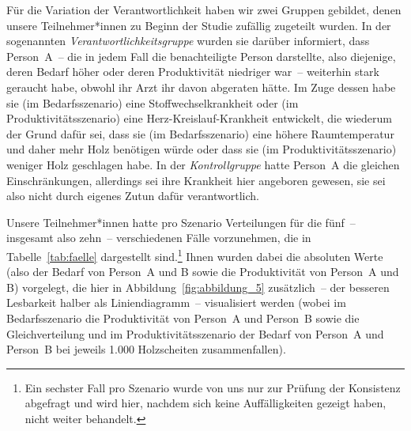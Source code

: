\documentclass[justified,nobib,nohyper,symmetric,twoside]{tufte-book}
\begin{document}
Für die Variation der Verantwortlichkeit haben wir zwei Gruppen gebildet, denen unsere Teilnehmer*innen zu Beginn der Studie zufällig zugeteilt wurden.
In der sogenannten \textit{Verantwortlichkeitsgruppe} wurden sie darüber informiert, dass Person~A~-- die in jedem Fall die benachteiligte Person darstellte, also diejenige, deren Bedarf höher oder deren Produktivität niedriger war~-- weiterhin stark geraucht habe, obwohl ihr Arzt ihr davon abgeraten hätte.
Im Zuge dessen habe sie (im Bedarfs\-szenario) eine Stoffwechselkrankheit oder (im Produktivitätsszenario) eine Herz-Kreislauf-Krankheit entwickelt, die wiederum der Grund dafür sei, dass sie (im Bedarfsszenario) eine höhere Raumtemperatur und daher mehr Holz benötigen würde oder dass sie (im Produktivitätsszenario) weniger Holz geschlagen habe.
In der \textit{Kontrollgruppe} hatte Person~A die gleichen Einschränkungen, allerdings sei ihre Krankheit hier angeboren gewesen, sie sei also nicht durch eigenes Zutun dafür verantwortlich.

Unsere Teilnehmer*innen hatte pro Szenario Verteilungen für die fünf~-- insgesamt also zehn~-- verschiedenen Fälle vorzunehmen, die in Tabelle~\ref{tab:faelle} dargestellt sind.\footnote{Ein sechster Fall pro Szenario wurde von uns nur zur Prüfung der Konsistenz abgefragt und wird hier, nachdem sich keine Auffälligkeiten gezeigt haben, nicht weiter behandelt.}
Ihnen wurden dabei die absoluten Werte (also der Bedarf von Person~A und B sowie die Produktivität von Person~A und B) vorgelegt, die hier in Abbildung~\ref{fig:abbildung_5} zusätzlich~-- der besseren Lesbarkeit halber als Liniendiagramm~-- visualisiert werden (wobei im Bedarfsszenario die Produktivität von Person~A und Person~B sowie die Gleichverteilung und im Produktivitätsszenario der Bedarf von Person~A und Person~B bei jeweils 1.000 Holzscheiten zusammenfallen).
\end{document}
